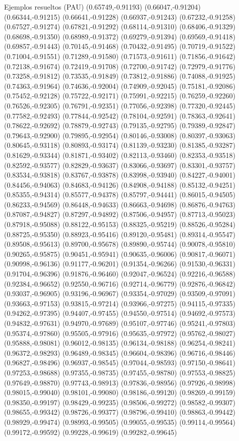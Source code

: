 \documentclass[11pt,a4paper]{article}
\begin{document}
\begin{fmex}{Ejemplos resueltos (PAU)}
(0.65749,-0.91193) (0.66047,-0.91204) (0.66344,-0.91215) (0.66641,-0.91228) (0.66937,-0.91243) (0.67232,-0.91258) (0.67527,-0.91274) (0.67821,-0.91292) (0.68114,-0.91310) (0.68406,-0.91329) (0.68698,-0.91350) (0.68989,-0.91372) (0.69279,-0.91394) (0.69569,-0.91418) (0.69857,-0.91443) (0.70145,-0.91468) (0.70432,-0.91495) (0.70719,-0.91522) (0.71004,-0.91551) (0.71289,-0.91580) (0.71573,-0.91611) (0.71856,-0.91642) (0.72138,-0.91674) (0.72419,-0.91708) (0.72700,-0.91742) (0.72979,-0.91776) (0.73258,-0.91812) (0.73535,-0.91849) (0.73812,-0.91886) (0.74088,-0.91925) (0.74363,-0.91964) (0.74636,-0.92004) (0.74909,-0.92045) (0.75181,-0.92086) (0.75452,-0.92128) (0.75722,-0.92171) (0.75991,-0.92215) (0.76259,-0.92260) (0.76526,-0.92305) (0.76791,-0.92351) (0.77056,-0.92398) (0.77320,-0.92445) (0.77582,-0.92493) (0.77844,-0.92542) (0.78104,-0.92591) (0.78363,-0.92641) (0.78622,-0.92692) (0.78879,-0.92743) (0.79135,-0.92795) (0.79389,-0.92847) (0.79643,-0.92900) (0.79895,-0.92954) (0.80146,-0.93008) (0.80397,-0.93063) (0.80645,-0.93118) (0.80893,-0.93174) (0.81139,-0.93230) (0.81385,-0.93287) (0.81629,-0.93344) (0.81871,-0.93402) (0.82113,-0.93460) (0.82353,-0.93518) (0.82592,-0.93577) (0.82829,-0.93637) (0.83066,-0.93697) (0.83301,-0.93757) (0.83534,-0.93818) (0.83767,-0.93878) (0.83998,-0.93940) (0.84227,-0.94001) (0.84456,-0.94063) (0.84683,-0.94126) (0.84908,-0.94188) (0.85132,-0.94251) (0.85355,-0.94314) (0.85577,-0.94378) (0.85797,-0.94441) (0.86015,-0.94505) (0.86233,-0.94569) (0.86448,-0.94633) (0.86663,-0.94698) (0.86876,-0.94763) (0.87087,-0.94827) (0.87297,-0.94892) (0.87506,-0.94957) (0.87713,-0.95023) (0.87918,-0.95088) (0.88122,-0.95153) (0.88325,-0.95219) (0.88526,-0.95284) (0.88725,-0.95350) (0.88923,-0.95416) (0.89120,-0.95481) (0.89314,-0.95547) (0.89508,-0.95613) (0.89700,-0.95678) (0.89890,-0.95744) (0.90078,-0.95810) (0.90265,-0.95875) (0.90451,-0.95941) (0.90635,-0.96006) (0.90817,-0.96071) (0.90998,-0.96136) (0.91177,-0.96201) (0.91354,-0.96266) (0.91530,-0.96331) (0.91704,-0.96396) (0.91876,-0.96460) (0.92047,-0.96524) (0.92216,-0.96588) (0.92384,-0.96652) (0.92550,-0.96716) (0.92714,-0.96779) (0.92876,-0.96842) (0.93037,-0.96905) (0.93196,-0.96967) (0.93354,-0.97029) (0.93509,-0.97091) (0.93663,-0.97153) (0.93815,-0.97214) (0.93966,-0.97275) (0.94115,-0.97335) (0.94262,-0.97395) (0.94407,-0.97455) (0.94550,-0.97514) (0.94692,-0.97573) (0.94832,-0.97631) (0.94970,-0.97689) (0.95107,-0.97746) (0.95241,-0.97803) (0.95374,-0.97860) (0.95505,-0.97916) (0.95635,-0.97972) (0.95762,-0.98027) (0.95888,-0.98081) (0.96012,-0.98135) (0.96134,-0.98188) (0.96254,-0.98241) (0.96372,-0.98293) (0.96489,-0.98345) (0.96604,-0.98396) (0.96716,-0.98446) (0.96827,-0.98496) (0.96937,-0.98545) (0.97044,-0.98593) (0.97150,-0.98641) (0.97253,-0.98688) (0.97355,-0.98735) (0.97455,-0.98780) (0.97553,-0.98825) (0.97649,-0.98870) (0.97743,-0.98913) (0.97836,-0.98956) (0.97926,-0.98998) (0.98015,-0.99040) (0.98101,-0.99080) (0.98186,-0.99120) (0.98269,-0.99159) (0.98350,-0.99197) (0.98429,-0.99235) (0.98506,-0.99272) (0.98582,-0.99307) (0.98655,-0.99342) (0.98726,-0.99377) (0.98796,-0.99410) (0.98863,-0.99442) (0.98929,-0.99474) (0.98993,-0.99505) (0.99055,-0.99535) (0.99114,-0.99564) (0.99172,-0.99592) (0.99228,-0.99619) (0.99282,-0.99645) 
\end{fmex}
\end{document}

